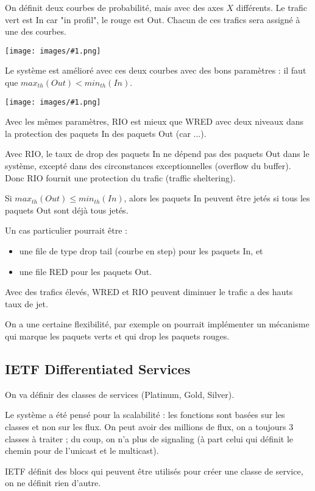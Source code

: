 \documentclass[10pt,a4paper]{report}
\newcommand{\dessin}[1]{\begin{center}\texttt{[image: images/\#1.png]}\end{center}}
\begin{document}
			On définit deux courbes de probabilité, mais avec des axes $X$ différents. Le trafic vert est In car "in profil", le rouge est Out. Chacun de ces trafics sera assigné à une des courbes.
			\dessin{114}
			
			Le système est amélioré avec ces deux courbes avec des bons paramètres : il faut que $max_{th}(Out) < min_{th}(In)$. 
			
			\dessin{115}
			
			Avec les mêmes paramètres, RIO est mieux que WRED avec deux niveaux dans la protection des paquets In des paquets Out (car ...).
			
			Avec RIO, le taux de drop des paquets In ne dépend pas des paquets Out dans le système, excepté dans des circonstances exceptionnelles (overflow du buffer). Donc RIO fournit une protection du trafic (traffic sheltering).
			
			Si $max_{th}(Out) \leq min_{th}(In)$, alors les paquets In peuvent être jetés si tous les paquets Out sont déjà tous jetés.
			
			Un cas particulier pourrait être :
			
			\begin{itemize}
				\item une file de type drop tail (courbe en step) pour les paquets In, et
				\item une file RED pour les paquets Out.
			\end{itemize}
			
			
			Avec des trafics élevés, WRED et RIO peuvent diminuer le trafic a des hauts taux de jet.			
			
			On a une certaine flexibilité, par exemple on pourrait implémenter un mécanisme qui marque les paquets verts et qui drop les paquets rouges.
			
			
		\subsection{IETF Differentiated Services}
		
		On va définir des classes de services (Platinum, Gold, Silver).
		
		Le système a été pensé pour la scalabilité : les fonctions sont basées sur les classes et non sur les flux. On peut avoir des millions de flux, on a toujours 3 classes à traiter ; du coup, on n'a plus de signaling (à part celui qui définit le chemin pour de l'unicast et le multicast).
		
		IETF définit des blocs qui peuvent être utilisés pour créer une classe de service, on ne définit rien d'autre.
		
\end{document}

